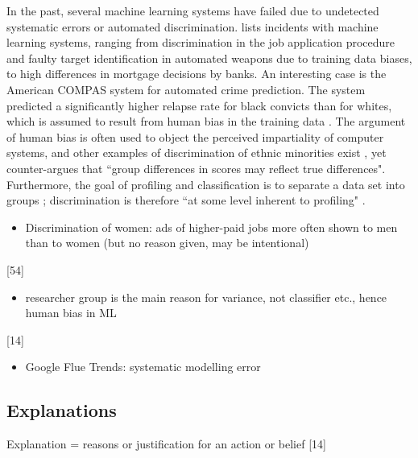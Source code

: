 In the past, several machine learning systems have failed due to undetected systematic errors or automated discrimination. \cite{guidotti2018survey} lists incidents with machine learning systems, ranging from discrimination in the job application procedure and faulty target identification in automated weapons due to training data biases, to high differences in mortgage decisions by banks. An interesting case is the American COMPAS system for automated crime prediction. The system predicted a significantly higher relapse rate for black convicts than for whites, which is assumed to result from human bias in the training data \cite{guidotti2018survey}. The argument of human bias is often used to object the perceived impartiality of computer systems, and other examples of discrimination of ethnic minorities exist \cite{guidotti2018survey}, yet \cite{skeem2016risk} counter-argues that ``group differences in scores may reflect true differences". Furthermore, the goal of profiling and classification is to separate a data set into groups \cite{goodman16eu}; discrimination is therefore ``at some level inherent to profiling" \cite{datta2015automated}. 




\begin{itemize}
	\item Discrimination of women: ads of higher-paid jobs more often shown to men than to women (but no reason given, may be intentional)
\end{itemize}
[54]
\begin{itemize}
	\item researcher group is the main reason for variance, not classifier etc., hence human bias in ML
\end{itemize}
[14]
\begin{itemize}
	\item Google Flue Trends: systematic modelling error 
\end{itemize}







\subsection{Explanations}
Explanation = reasons or justification for an action or belief [14]\newline

